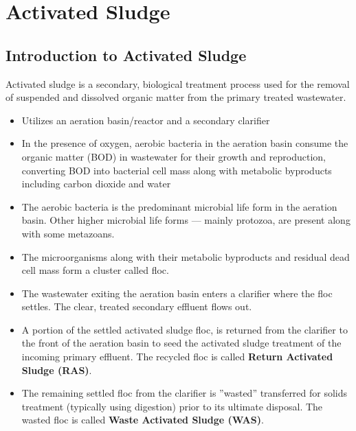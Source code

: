 
\chapter{Activated Sludge}

\section{Introduction to Activated Sludge}
Activated sludge is a secondary, biological treatment process used for the removal of suspended and dissolved organic matter from the primary treated wastewater.
\begin{itemize}
\item Utilizes an aeration basin/reactor and a secondary clarifier

\item In the presence of oxygen, aerobic bacteria in the aeration basin consume the organic matter (BOD) in wastewater for their growth and reproduction, converting BOD into bacterial cell mass along with metabolic byproducts including carbon dioxide and water

\item The aerobic bacteria is the predominant microbial life form in the aeration basin.  Other higher microbial life forms — mainly protozoa, are present along with some metazoans.

\item The microorganisms along with their metabolic byproducts and residual dead cell mass form a cluster called floc.

\item The wastewater exiting the aeration basin enters a clarifier where the floc settles.  The clear, treated secondary effluent flows out.

\item A portion of the settled activated sludge floc, is returned from the clarifier to the front of the aeration basin to seed the activated sludge treatment of the incoming primary effluent. The recycled floc is called \textbf{Return Activated Sludge (RAS)}.

\item The remaining settled floc from the clarifier is ”wasted” \textemdash transferred for solids treatment (typically using digestion) prior to its ultimate disposal. The wasted floc is called \textbf{Waste Activated Sludge (WAS)}.


\end{itemize}
